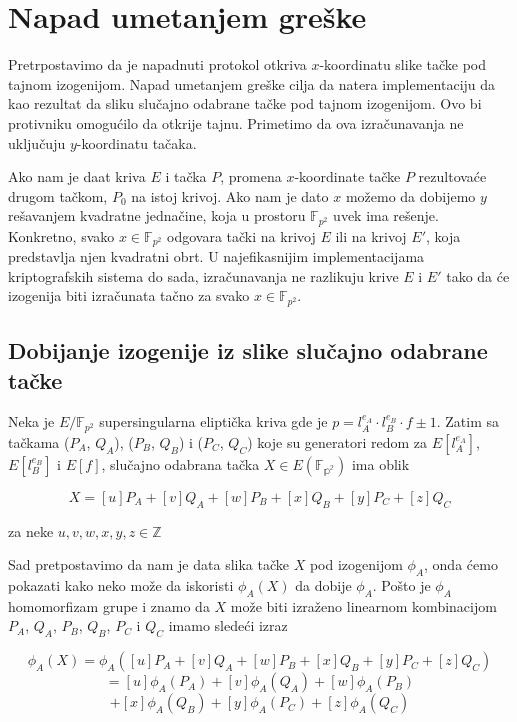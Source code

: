 \documentclass[a4paper]{article}
\begin{document}
\section{Napad umetanjem greške}

Pretrpostavimo da je napadnuti protokol otkriva $x$-koordinatu slike tačke pod tajnom izogenijom. Napad umetanjem greške cilja da natera implementaciju da kao rezultat da sliku slučajno odabrane tačke pod tajnom izogenijom. Ovo bi protivniku omogućilo da otkrije tajnu. Primetimo da ova izračunavanja ne uključuju $y$-koordinatu tačaka. 

Ako nam je daat kriva $E$ i tačka $P$, promena $x$-koordinate tačke $P$ rezultovaće drugom tačkom, $P_0$ na istoj krivoj. Ako nam je dato $x$ možemo da dobijemo $y$ rešavanjem kvadratne jednačine, koja u prostoru $\mathbb{F}_{p^2}$ uvek ima rešenje. Konkretno, svako $x \in \mathbb{F}_{p^2}$ odgovara tački na krivoj $E$ ili na krivoj $E'$, koja predstavlja njen kvadratni obrt. U najefikasnijim implementacijama kriptografskih sistema do sada, izračunavanja ne razlikuju krive $E$ i $E'$ tako da će izogenija biti izračunata tačno za svako $x \in \mathbb{F}_{p^2}$. 


\subsection{Dobijanje izogenije iz slike slučajno odabrane tačke}

Neka je $E/\mathbb{F}_{p^2}$ supersingularna eliptička kriva gde je  $p = l^{e_A}_{A} \cdot l^{e_B}_{B} \cdot f \pm 1$. Zatim sa tačkama ($P_A$, $Q_A$), ($P_B$, $Q_B$) i
($P_C$, $Q_C$) koje su generatori redom za $E[l^{e_A}_{A}]$, $E[l^{e_B}_{B}]$ i $E[f]$, slučajno odabrana tačka $X \in E(\mathbb{F_{p^2}})$ ima oblik

$$X = [u]P_A + [v]Q_A + [w]P_B + [x]Q_B + [y]P_C + [z]Q_C$$

\noindent za neke $u, v, w, x, y, z \in \mathbb{Z}$

Sad pretpostavimo da nam je data slika tačke $X$ pod izogenijom $\phi_A$, onda ćemo pokazati kako neko može da iskoristi $\phi_A(X)$ da dobije $\phi_A$. Pošto je $\phi_A$ homomorfizam grupe i znamo da $X$ može biti izraženo linearnom kombinacijom  $P_A$, $Q_A$, $P_B$, $Q_B$, $P_C$ i $Q_C$ imamo sledeći izraz

$$\phi_A(X) = \phi_A([u]P_A + [v]Q_A + [w]P_B + [x]Q_B + [y]P_C + [z]Q_C) $$
$$= [u]\phi_A(P_A) + [v]\phi_A(Q_A) + [w]\phi_A(P_B) $$
$$+ [x]\phi_A(Q_B) + [y]\phi_A(P_C) + [z]\phi_A(Q_C)$$
\end{document}
